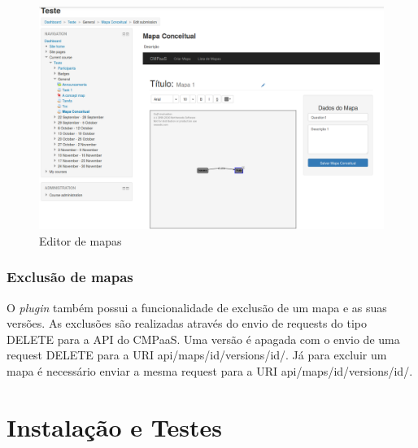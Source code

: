 \documentclass[
	12pt,				%
	openright,			%
	oneside,			%
	a4paper,			%
	english,			%
	french,				%
	spanish,			%
	brazil				%
	]{abntex2}
\begin{document}
\begin{figure}[htb]
	\caption{\label{fig_editor} Editor de mapas}
	\begin{center}
		\includegraphics[scale=0.2]{editor.png}
	\end{center}
\end{figure}

\subsection{Exclusão de mapas} 

O \textit{plugin} também possui a funcionalidade de exclusão de um mapa e as suas versões. As exclusões são realizadas através do envio de requests do tipo DELETE para a API do CMPaaS. Uma versão é apagada com o envio de uma request DELETE para a URI api/maps/id/versions/id/. Já para excluir um mapa é necessário enviar a mesma request para a URI api/maps/id/versions/id/.   

\chapter{Instalação e Testes}
\end{document}
